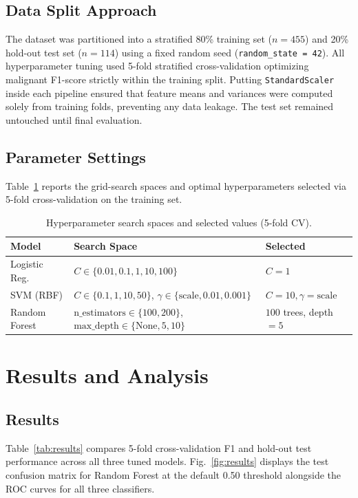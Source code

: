 \documentclass[conference,a4paper]{IEEEtran}
\begin{document}
\subsection{Data Split Approach}
The dataset was partitioned into a stratified 80\% training set ($n = 455$) and 20\% hold-out test set ($n = 114$) using a fixed random seed (\texttt{random\_state = 42}). All hyperparameter tuning used 5-fold stratified cross-validation optimizing malignant F1-score strictly within the training split. Putting \texttt{StandardScaler} inside each pipeline ensured that feature means and variances were computed solely from training folds, preventing any data leakage. The test set remained untouched until final evaluation.

\subsection{Parameter Settings}
Table~\ref{tab:params} reports the grid-search spaces and optimal hyperparameters selected via 5-fold cross-validation on the training set.

\begin{table}[htbp]
\centering
\caption{Hyperparameter search spaces and selected values (5-fold CV).}
\label{tab:params}
\scriptsize
\begin{tabularx}{\columnwidth}{lXl}
\toprule
\textbf{Model} & \textbf{Search Space} & \textbf{Selected} \\
\midrule
Logistic Reg. & $C \in \{0.01, 0.1, 1, 10, 100\}$ & $C = 1$ \\
SVM (RBF) & $C \in \{0.1, 1, 10, 50\}$, $\gamma \in \{\text{scale}, 0.01, 0.001\}$ & $C = 10, \gamma = \text{scale}$ \\
Random Forest & $\text{n\_estimators} \in \{100, 200\}$, $\text{max\_depth} \in \{\text{None}, 5, 10\}$ & $100$ trees, depth $= 5$ \\
\bottomrule
\end{tabularx}
\end{table}

\section{Results and Analysis}
\subsection{Results}
Table~\ref{tab:results} compares 5-fold cross-validation F1 and hold-out test performance across all three tuned models. Fig.~\ref{fig:results} displays the test confusion matrix for Random Forest at the default 0.50 threshold alongside the ROC curves for all three classifiers.
\end{document}
